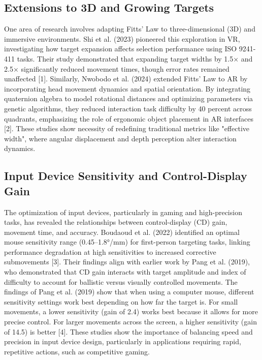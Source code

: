 \documentclass[acmlarge]{acmart}
\begin{document}
\subsection{Extensions to 3D and Growing Targets}
One area of research involves adapting Fitts’ Law to three-dimensional (3D) and immersive environments. Shi et al. (2023) pioneered this exploration in VR, investigating how target expansion affects selection performance using ISO 9241-411 tasks. Their study demonstrated that expanding target widths by 1.5× and 2.5× significantly reduced movement times, though error rates remained unaffected [1]. Similarly, Nwobodo et al. (2024) extended Fitts’ Law to AR by incorporating head movement dynamics and spatial orientation. By integrating quaternion algebra to model rotational distances and optimizing parameters via genetic algorithms, they reduced interaction task difficulty by 40 percent across quadrants, emphasizing the role of ergonomic object placement in AR interfaces [2]. These studies show necessity of redefining traditional metrics like "effective width", where angular displacement and depth perception alter interaction dynamics. 
\subsection{Input Device Sensitivity and Control-Display Gain}
The optimization of input devices, particularly in gaming and high-precision tasks, has revealed the relationships between control-display (CD) gain, movement time, and accuracy. Boudaoud et al. (2022) identified an optimal mouse sensitivity range (0.45–1.8°/mm) for first-person targeting tasks, linking performance degradation at high sensitivities to increased corrective submovements [3]. Their findings align with earlier work by Pang et al. (2019), who demonstrated that CD gain interacts with target amplitude and index of difficulty to account for ballistic versus visually controlled movements. The findings of  Pang et al. (2019) show that when using a computer mouse, different sensitivity settings work best depending on how far the target is. For small movements, a lower sensitivity (gain of 2.4) works best because it allows for more precise control. For larger movements across the screen, a higher sensitivity (gain of 14.5) is better [4]. These studies show the importance of balancing speed and precision in input device design, particularly in applications requiring rapid, repetitive actions, such as competitive gaming.
\end{document}
